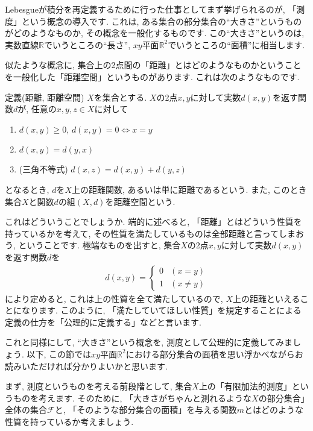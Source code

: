 Lebesgueが積分を再定義するために行った仕事としてまず挙げられるのが, 「測度」という概念の導入です. これは, ある集合の部分集合の“大きさ”というものがどのようなものか, その概念を一般化するものです. この“大きさ”というのは, 実数直線$\mathbb{R}$でいうところの“長さ”, $xy$平面$\mathbb{R}^2$でいうところの“面積”に相当します. 
\par 似たような概念に, 集合上の2点間の「距離」とはどのようなものかということを一般化した「距離空間」というものがあります. これは次のようなものです. 
\begin{itembox}[l]{定義(距離, 距離空間)}
$X$を集合とする. $X$の2点$x,y$に対して実数$d(x,y)$を返す関数$d$が, 任意の$x,y,z\in X$に対して
\begin{enumerate}
\item $d(x,y) \ge 0$, $d(x,y)=0 \Leftrightarrow x=y$
\item $d(x,y)=d(y,x)$
\item (三角不等式) $d(x,z)=d(x,y)+d(y,z)$
\end{enumerate}
となるとき, $d$を$X$上の距離関数, あるいは単に距離であるという. また, このとき集合$X$と関数$d$の組$(X,d)$を距離空間という. 
\end{itembox}
\par これはどういうことでしょうか. 端的に述べると, 「距離」とはどういう性質を持っているかを考えて, その性質を満たしているものは全部距離と言ってしまおう, ということです. 極端なものを出すと, 集合$X$の2点$x,y$に対して実数$d(x,y)$を返す関数$d$を
\begin{eqnarray}
d(x,y)=\begin{cases}
0 & (x=y) \nonumber \\
1 & (x \neq y) \nonumber
\end{cases}
\end{eqnarray}
により定めると, これは上の性質を全て満たしているので, $X$上の距離といえることになります. このように, 「満たしていてほしい性質」を規定することによる定義の仕方を「公理的に定義する」などと言います. 
\par これと同様にして, “大きさ”という概念を, 測度として公理的に定義してみましょう. 以下, この節では$xy$平面$\mathbb{R}^2$における部分集合の面積を思い浮かべながらお読みいただければ分かりよいかと思います. 
\par まず, 測度というものを考える前段階として, 集合$X$上の「有限加法的測度」というものを考えます. そのために, 「大きさがちゃんと測れるような$X$の部分集合」全体の集合$\mathcal{F}$と, 「そのような部分集合の面積」を与える関数$m$とはどのような性質を持っているか考えましょう. 
